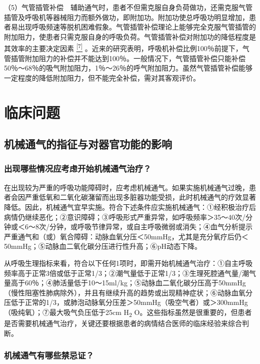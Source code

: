 （5）气管插管补偿　辅助通气时，患者不但需克服自身负荷做功，还需克服气管插管及呼吸机等器械阻力而额外做功，即附加功。附加功使总呼吸功明显增加，患者易出现呼吸频速等脱机困难假象。气管插管补偿理论上能够完全克服气管插管的附加阻力，使患者只需克服自身的呼吸负荷。气管插管补偿对附加功的降低程度是其效率的主要决定因素
\protect\hyperlink{text00016.htmlux5cux23ch7-15}{\textsuperscript{{[}7{]}}}
。近来的研究表明，呼吸机补偿比例100％前提下，气管插管附加阻力的补偿并不能达到100％。一般情况下，气管插管补偿只能补偿50％～68％的吸气附加阻力，1％～26％的呼气附加阻力。虽然气管插管补偿能够一定程度的降低附加阻力，但不能完全补偿，需对其客观评价。

\section{临床问题}

\subsection{机械通气的指征与对器官功能的影响}

\subsubsection{出现哪些情况应考虑开始机械通气治疗？}

在出现较为严重的呼吸功能障碍时，应考虑机械通气。如果实施机械通气过晚，患者会因严重低氧和二氧化碳潴留而出现多脏器功能受损，此时机械通气的疗效显著降低。因此，机械通气宜早实施。符合下述条件应实施机械通气：①经积极治疗后病情仍继续恶化；②意识障碍；③呼吸形式严重异常，如呼吸频率＞35～40次/分钟或＜6～8次/分钟，或呼吸节律异常，或自主呼吸微弱或消失；④血气分析提示严重通气和（或）氧合障碍：动脉血氧分压＜50mmHg，尤其是充分氧疗后仍＜50mmHg；⑤动脉血二氧化碳分压进行性升高；⑥pH动态下降。

从呼吸生理指标来看，符合以下任何1项时，即需开始机械通气治疗：①自主呼吸频率高于正常3倍或低于正常1/3；②潮气量低于正常1/3；③生理死腔通气量/潮气量高于60％；④肺活量低于10～15ml/kg；⑤动脉血二氧化碳分压高于50mmHg（慢性阻塞性肺病除外），并且有继续升高的趋势或出现精神症状；⑥动脉血氧分压低于正常的1/3，或肺泡动脉氧分压差＞50mmHg（吸空气者）或＞300mmHg（吸纯氧）；⑦最大吸气负压低于25cm
H\textsubscript{2}
O。这些指标虽然是很重要的，但患者是否需要机械通气治疗，关键还要根据患者的病情结合医师的临床经验来综合判断。

\subsubsection{机械通气有哪些禁忌证？}

